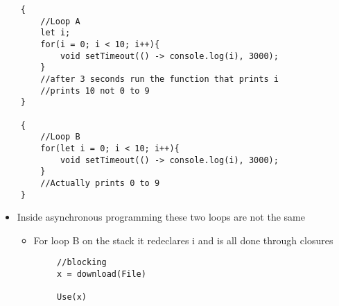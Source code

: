 \documentclass{article}
\begin{document}
\begin{lstlisting}
    {
        //Loop A
        let i;
        for(i = 0; i < 10; i++){
            void setTimeout(() -> console.log(i), 3000);
        }
        //after 3 seconds run the function that prints i
        //prints 10 not 0 to 9
    }

    {
        //Loop B
        for(let i = 0; i < 10; i++){
            void setTimeout(() -> console.log(i), 3000);
        }
        //Actually prints 0 to 9
    }
\end{lstlisting}
\begin{itemize}
    \item Inside asynchronous programming these two loops are not the same
    \begin{itemize}
        \item For loop B on the stack it redeclares i and is all done through closures
    \end{itemize}
    \begin{lstlisting}
        //blocking 
        x = download(File)

        Use(x)


\end{lstlisting}
\end{itemize}
\end{document}

